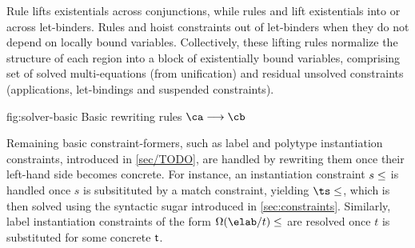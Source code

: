 \documentclass[acmsmall,screen,nonacm]{acmart}
\begin{document}
\begingroup
\sloppy Rule  lifts existentials across
conjunctions, while rules  and 
lift existentials into or across let-binders.
%
Rules  and
 hoist constraints out of let-binders when they do not
depend on locally bound variables. Collectively, these lifting rules
normalize the structure of each region into a block of existentially bound
variables, comprising set of solved multi-equations (from unification) and
residual unsolved constraints (\ie applications, let-bindings and suspended
constraints).
\par
\endgroup

\begin{mathparfig}[t]
  {fig:solver-basic}
  {Basic rewriting rules $\ca \csolve \cb$}
  \rewrite[S-Unif]
    {\upa \\ \upa \unif \upb}
    {\upb}

  \rewrite[S-Let]
    {\clet \x \tv \ca \cb}
    {\cletr \x \tv \eset \ca \cb}

    {\cexists \tv {\ca \cand \cb}}

    {\cletr \x \tv {\tvs, \tvb} \ca \cb}

    {\cexists \tvb {\clet \x \tvs \ca \cb}}

    {\ca \cand \cletr \x \tv \tvs \cb \cc}

    {\cc \cand \Clet \x \tv \ca \cb}
\end{mathparfig}


Remaining basic constraint-formers, such as label and polytype instantiation
constraints, introduced in \cref{sec/TODO}, are handled by rewriting them once
their left-hand side becomes concrete. For instance, an instantiation
constraint $s \leq \relax$ is handled once $s$ is subsitituted by a match constraint,
yielding $\ts \leq \t$, which is then solved using the syntactic sugar
introduced in \cref{sec:constraints}. Similarly, label instantiation
constraints of the form $\Omega(\elab/t) \leq \t$ are resolved once $t$ is
substituted for some concrete $\mathrel{\mathsf{t}}\mathclose{}$.
\end{document}
